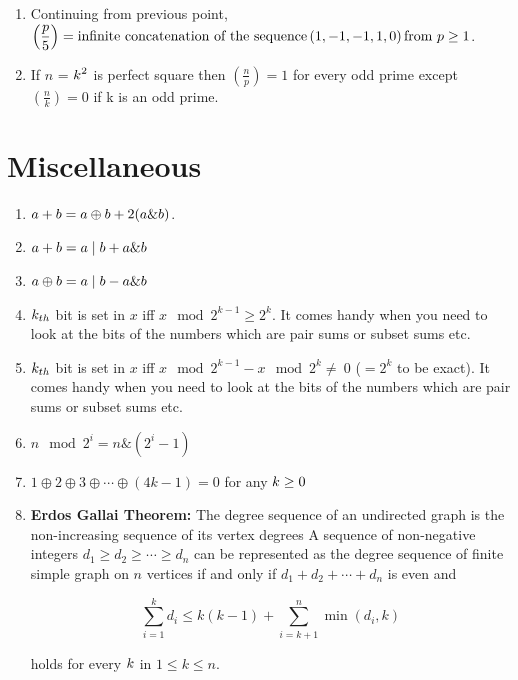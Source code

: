 \begin{enumerate}
     For example,  
     $\displaystyle \displaystyle\left(\frac{2}{5}\right)=-1,\;\;\;F_3=2,\;\;\;F_2=1,$  
     $\displaystyle \displaystyle\left(\frac{3}{5}\right)=-1,\;\;\; F_4=3,\;\;\;F_3=2,$  
    
     $\displaystyle \displaystyle\left(\frac{5}{5}\right)=\;\;\;0,\;\;\; F_5=5,$
    
     $\displaystyle \displaystyle\left(\frac{7}{5}\right)=-1,\;\; F_8=21,\;\;F_7=13,$
     
     $\displaystyle \displaystyle\left(\frac{11}{5}\right)=\;\;1,\;\; F_{10}=55,\;\;F_{11}=89,$
    
\item Continuing from previous point, $\displaystyle \displaystyle \left(\frac{p}{5}\right)={\text{infinite concatenation of the sequence}}\left(1,-1,-1,1,0\right) {\text{from }}p \geq 1$.
\item If $n$ = $\displaystyle \displaystyle k^2$ is perfect square then $\displaystyle \left(\frac{n}{p}\right)=1$ for every odd prime except $\displaystyle \left(\frac{n}{k}\right)=0$ if k is an odd prime.  
\end{enumerate}


\section{Miscellaneous}
\begin{enumerate}
\item $\displaystyle \displaystyle a+b = a \oplus b +2(a \& b)$.
\item $\displaystyle \displaystyle a + b = a \mid b + a \& b$ 
\item $\displaystyle \displaystyle a \oplus b = a\mid b - a \& b$
\item $\displaystyle \displaystyle k_{th}$ bit is set in $\displaystyle x$ iff $\displaystyle x \mod 2^{k - 1}\geq 2^k$. It comes handy when you need to look at the bits of the numbers which are pair sums or subset sums etc.
\item $\displaystyle \displaystyle k_{th}$ bit is set in $\displaystyle x$ iff $\displaystyle x \mod 2^{k - 1} - x \mod 2^k \neq\ 0$ ($ = 2^k$ to be exact). It comes handy when you need to look at the bits of the numbers which are pair sums or subset sums etc.
\item $n \mod 2^i = n \& (2^i - 1)$
\item $\displaystyle 1\oplus 2 \oplus 3 \oplus \cdots \oplus (4k - 1) = 0$ for any $\displaystyle \displaystyle k \ge 0$
\item \textbf{Erdos Gallai Theorem:}
     The degree sequence of an undirected graph is the non-increasing sequence of its vertex degrees  
     A sequence of non-negative integers $d_1 \geq d_2 \geq \cdots \geq d_n$ can be represented as the degree sequence of finite simple graph on $n$ vertices if and only if $d_1 + d_2 + \cdots + d_n$ is even and 
     
     $$\displaystyle \sum_{i = 1}^k {d_i \leq k(k - 1)} + \sum_{i = k + 1}^n \min(d_i, k)$$

     holds for every $\displaystyle \displaystyle k$ in $\displaystyle 1 \leq k \leq n$.
\end{enumerate}

